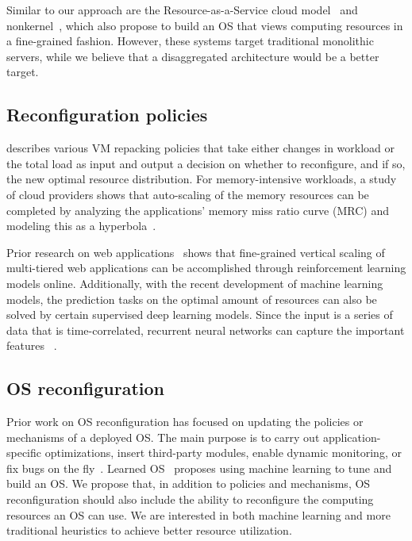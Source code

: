 Similar to our approach are the Resource-as-a-Service cloud
model~\cite{ben2012resource} and nonkernel~\cite{ben2013nonkernel},
which also propose to build an OS that views computing resources
in a fine-grained fashion.  However, these systems target traditional
monolithic servers, while we believe that a disaggregated architecture
would be a better target.


\subsection{Reconfiguration policies}
\cite{sedaghat2013virtual} describes various VM repacking
policies that take either changes in workload or the
total load as input and output a decision on whether to reconfigure,
and if so, the new optimal resource distribution.
For memory-intensive workloads, a study of cloud providers shows that
auto-scaling of the memory resources can be completed by analyzing the
applications' memory miss ratio curve (MRC) and modeling this as a
hyperbola~\cite{novak2020auto}.

Prior research on web applications~\cite{yazdanov2014lightweight}
shows that fine-grained vertical scaling of multi-tiered web
applications can be accomplished through reinforcement learning
models online.  Additionally, with the recent development of machine
learning models, the prediction tasks on the optimal amount of
resources can also be solved by certain supervised deep learning
models.  Since the input is a series of data that is time-correlated,
recurrent neural networks can capture the important features
~\cite{gers1999learning}.

\subsection{OS reconfiguration}
Prior work on OS reconfiguration has focused on updating the
policies or mechanisms of a deployed OS. The main purpose is to
carry out application-specific optimizations, insert third-party
modules, enable dynamic monitoring, or fix bugs on the
fly~\cite{soules2003system, baumann2007reboots, baumann2005providing,
chen2006live, chen2007polus}. Learned OS~\cite{zhang2019learned}
proposes using machine learning to tune and build an OS. We propose
that, in addition to policies and mechanisms, OS reconfiguration
should also include the ability to reconfigure the computing resources
an OS can use.  We are interested in both machine learning and more
traditional heuristics to achieve better resource utilization.
 
